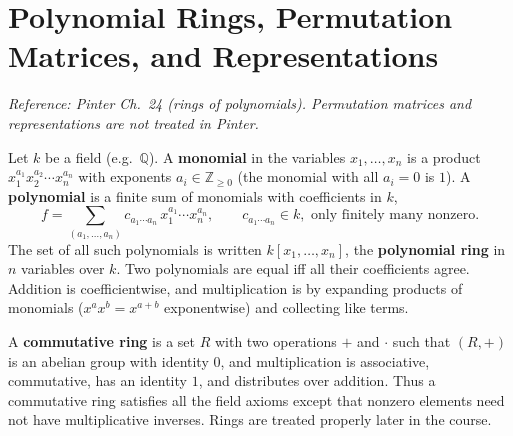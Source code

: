 \documentclass[11pt]{report}
\begin{document}
\section{Polynomial Rings, Permutation Matrices, and Representations}\label{sec:actions}

\textit{Reference: Pinter Ch.\ 24 (rings of polynomials). Permutation matrices and representations are not treated in Pinter.}

\begin{defbox}\label{def:polynomial-ring-several-variables}
Let $k$ be a field (e.g.\ $\mathbb{Q}$). A \textbf{monomial} in the variables $x_1, \ldots, x_n$ is a product $x_1^{a_1} x_2^{a_2} \cdots x_n^{a_n}$ with exponents $a_i \in \mathbb{Z}_{\geq 0}$ (the monomial with all $a_i = 0$ is $1$). A \textbf{polynomial} is a finite sum of monomials with coefficients in $k$,
\[ f = \sum_{(a_1, \ldots, a_n)} c_{a_1 \cdots a_n}\, x_1^{a_1} \cdots x_n^{a_n}, \qquad c_{a_1 \cdots a_n} \in k, \text{ only finitely many nonzero}. \]
The set of all such polynomials is written $k[x_1, \ldots, x_n]$, the \textbf{polynomial ring} in $n$ variables over $k$. Two polynomials are equal iff all their coefficients agree. Addition is coefficientwise, and multiplication is by expanding products of monomials ($x^{a} x^{b} = x^{a+b}$ exponentwise) and collecting like terms.
\end{defbox}

\begin{defbox}\label{def:commutative-ring-provisional}
A \textbf{commutative ring} is a set $R$ with two operations $+$ and $\cdot$ such that $(R, +)$ is an abelian group with identity $0$, and multiplication is associative, commutative, has an identity $1$, and distributes over addition. Thus a commutative ring satisfies all the field axioms except that nonzero elements need not have multiplicative inverses. Rings are treated properly later in the course.
\end{defbox}
\end{document}
